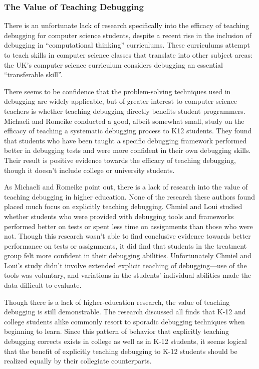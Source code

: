 \documentclass[12pt]{article}
\begin{document}
\subsubsection{The Value of Teaching Debugging}

There is an unfortunate lack of research specifically into the
efficacy of teaching debugging for computer science students, despite
a recent rise in the inclusion of debugging in ``computational
thinking'' curriculums\cite{10.1145/3361721.3361724}.  These
curriculums attempt to teach skills in computer science classes that
translate into other subject areas: the UK's computer science
curriculum considers debugging an essential ``transferable
skill''\cite{10.1145/2602484}.\par

There seems to be confidence that the problem-solving techniques used
in debugging are widely applicable, but of greater interest to
computer science teachers is whether teaching debugging directly
benefits student programmers.  Michaeli and Romeike conducted a good,
albeit somewhat small, study on the efficacy of teaching a systematic
debugging process to K12 students.  They found that students who have
been taught a specific debugging framework performed better in
debugging tests and were more confident in their own debugging
skills\cite{10.1145/3361721.3361724}.  Their result is positive
evidence towards the efficacy of teaching debugging, though it doesn't
include college or university students.\par

As Michaeli and Romeike point out, there is a lack of research into
the value of teaching debugging in higher education.  None of the
research these authors found placed much focus on explicitly teaching
debugging.  Chmiel and Loui studied whether students who were provided
with debugging tools and frameworks performed better on tests or spent
less time on assignments than those who were
not\cite{10.1145/971300.971310}.  Though this research wasn't able to
find conclusive evidence towards better performance on tests or
assignments, it did find that students in the treatment group felt
more confident in their debugging abilities.  Unfortunately Chmiel and
Loui's study didn't involve extended explicit teaching of
debugging---use of the tools was voluntary, and variations in the
students' individual abilities made the data difficult to
evaluate.\par

Though there is a lack of higher-education research, the value of
teaching debugging is still demonstrable.  The research discussed all
finds that K-12 and college students alike commonly resort to sporadic
debugging techniques when beginning to learn.  Since this pattern of
behavior that explicitly teaching debugging corrects exists in college
as well as in K-12 students, it seems logical that the benefit of
explicitly teaching debugging to K-12 students should be realized
equally by their collegiate counterparts.\par
\end{document}

